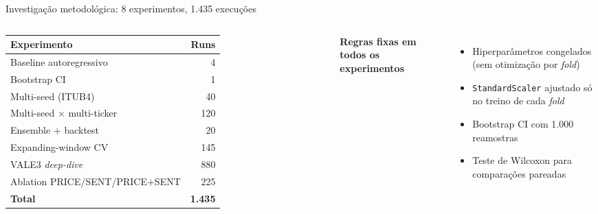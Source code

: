 \documentclass[11pt,aspectratio=169]{beamer}
\begin{document}
\begin{frame}{Investigação metodológica: 8 experimentos, 1.435 execuções}
  \begin{columns}[T]
    \begin{table}
      \scriptsize
      \begin{tabular}{lr}
        \toprule
        \textbf{Experimento} & \textbf{Runs} \\
        \midrule
        Baseline autoregressivo               & 4 \\
        Bootstrap CI                          & 1 \\
        Multi-seed (ITUB4)                    & 40 \\
        Multi-seed $\times$ multi-ticker      & 120 \\
        Ensemble + backtest                   & 20 \\
        Expanding-window CV                   & 145 \\
        VALE3 \textit{deep-dive}              & 880 \\
        Ablation PRICE/SENT/PRICE+SENT        & 225 \\
        \midrule
        \textbf{Total} & \textbf{1.435} \\
        \bottomrule
      \end{tabular}
    \end{table}
    \textbf{Regras fixas em todos os experimentos}
    \begin{itemize}
      \item Hiperparâmetros congelados (sem otimização por \textit{fold})
      \item \texttt{StandardScaler} ajustado só no treino de cada \textit{fold}
      \item Bootstrap CI com 1.000 reamostras
      \item Teste de Wilcoxon para comparações pareadas
    \end{itemize}
  \end{columns}
\end{frame}
\end{document}
